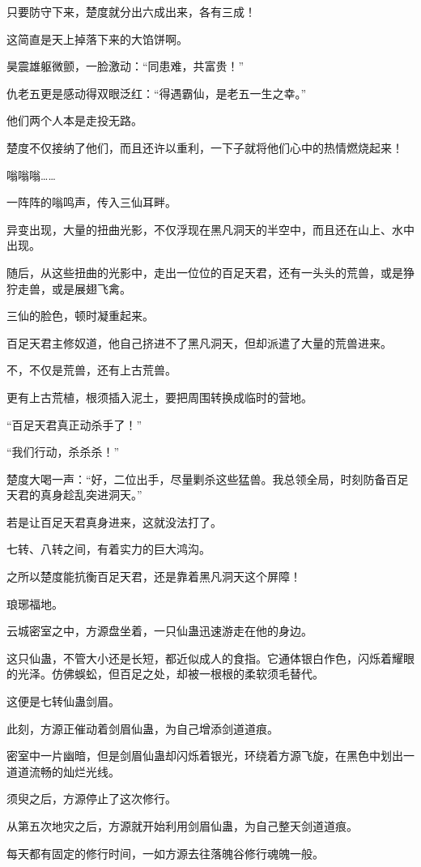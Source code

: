 \begin{this_body}
只要防守下来，楚度就分出六成出来，各有三成！

这简直是天上掉落下来的大馅饼啊。

昊震雄躯微颤，一脸激动：“同患难，共富贵！”

仇老五更是感动得双眼泛红：“得遇霸仙，是老五一生之幸。”

他们两个人本是走投无路。

楚度不仅接纳了他们，而且还许以重利，一下子就将他们心中的热情燃烧起来！

嗡嗡嗡……

一阵阵的嗡鸣声，传入三仙耳畔。

异变出现，大量的扭曲光影，不仅浮现在黑凡洞天的半空中，而且还在山上、水中出现。

随后，从这些扭曲的光影中，走出一位位的百足天君，还有一头头的荒兽，或是狰狞走兽，或是展翅飞禽。

三仙的脸色，顿时凝重起来。

百足天君主修奴道，他自己挤进不了黑凡洞天，但却派遣了大量的荒兽进来。

不，不仅是荒兽，还有上古荒兽。

更有上古荒植，根须插入泥土，要把周围转换成临时的营地。

“百足天君真正动杀手了！”

“我们行动，杀杀杀！”

楚度大喝一声：“好，二位出手，尽量剿杀这些猛兽。我总领全局，时刻防备百足天君的真身趁乱突进洞天。”

若是让百足天君真身进来，这就没法打了。

七转、八转之间，有着实力的巨大鸿沟。

之所以楚度能抗衡百足天君，还是靠着黑凡洞天这个屏障！

琅琊福地。

云城密室之中，方源盘坐着，一只仙蛊迅速游走在他的身边。

这只仙蛊，不管大小还是长短，都近似成人的食指。它通体银白作色，闪烁着耀眼的光泽。仿佛蜈蚣，但百足之处，却被一根根的柔软须毛替代。

这便是七转仙蛊剑眉。

此刻，方源正催动着剑眉仙蛊，为自己增添剑道道痕。

密室中一片幽暗，但是剑眉仙蛊却闪烁着银光，环绕着方源飞旋，在黑色中划出一道道流畅的灿烂光线。

须臾之后，方源停止了这次修行。

从第五次地灾之后，方源就开始利用剑眉仙蛊，为自己整天剑道道痕。

每天都有固定的修行时间，一如方源去往落魄谷修行魂魄一般。


\end{this_body}
